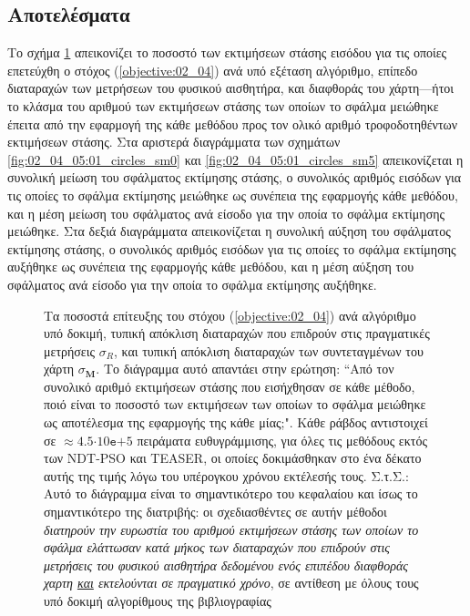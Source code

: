 \subsection{Αποτελέσματα}
\label{subsection:02_04_05:02}

Το σχήμα \ref{fig:02_04_05:01} απεικονίζει το ποσοστό των εκτιμήσεων στάσης
εισόδου για τις οποίες επετεύχθη ο στόχος (\ref{objective:02_04}) ανά υπό
εξέταση αλγόριθμο, επίπεδο διαταραχών των μετρήσεων του φυσικού αισθητήρα, και
διαφθοράς του χάρτη---ήτοι το κλάσμα του αριθμού των εκτιμήσεων στάσης των
οποίων το σφάλμα μειώθηκε έπειτα από την εφαρμογή της κάθε μεθόδου προς τον
ολικό αριθμό τροφοδοτηθέντων εκτιμήσεων στάσης. Στα αριστερά διαγράμματα των
σχημάτων \ref{fig:02_04_05:01_circles_sm0} και
\ref{fig:02_04_05:01_circles_sm5} απεικονίζεται η συνολική μείωση του σφάλματος
εκτίμησης στάσης, ο συνολικός αριθμός εισόδων για τις οποίες το σφάλμα
εκτίμησης μειώθηκε ως συνέπεια της εφαρμογής κάθε μεθόδου, και η μέση μείωση
του σφάλματος ανά είσοδο για την οποία το σφάλμα εκτίμησης μειώθηκε. Στα δεξιά
διαγράμματα απεικονίζεται η συνολική αύξηση του σφάλματος εκτίμησης στάσης, ο
συνολικός αριθμός εισόδων για τις οποίες το σφάλμα εκτίμησης αυξήθηκε ως
συνέπεια της εφαρμογής κάθε μεθόδου, και η μέση αύξηση του σφάλματος ανά είσοδο
για την οποία το σφάλμα εκτίμησης αυξήθηκε.


\begin{figure}\vspace{1.5cm}\hspace{0.6cm}%
  
  \vspace{0.75cm}
  \caption{\small Τα ποσοστά επίτευξης του στόχου (\ref{objective:02_04}) ανά
           αλγόριθμο υπό δοκιμή, τυπική απόκλιση διαταραχών που επιδρούν στις
           πραγματικές μετρήσεις $\sigma_R$, και τυπική απόκλιση διαταραχών των
           συντεταγμένων του χάρτη $\sigma_{\bm{M}}$. Το διάγραμμα αυτό
           απαντάει στην ερώτηση: ``Από τον συνολικό αριθμό εκτιμήσεων στάσης
           που εισήχθησαν σε κάθε μέθοδο, ποιό είναι το ποσοστό των εκτιμήσεων
           των οποίων το σφάλμα μειώθηκε ως αποτέλεσμα της εφαρμογής της κάθε
           μίας;". Κάθε ράβδος αντιστοιχεί σε $\approx
           4.5$$\cdot$$10\texttt{e}$$+$$5$ πειράματα ευθυγράμμισης, για όλες
           τις μεθόδους εκτός των NDT-PSO και TEASER, οι οποίες δοκιμάσθηκαν
           στο ένα δέκατο αυτής της τιμής λόγω του υπέρογκου χρόνου εκτέλεσής
           τους.  Σ.τ.Σ.: Αυτό το διάγραμμα είναι το σημαντικότερο του
           κεφαλαίου και ίσως το σημαντικότερο της διατριβής: οι σχεδιασθέντες
           σε αυτήν μέθοδοι \textit{διατηρούν την ευρωστία του αριθμού
           εκτιμήσεων στάσης των οποίων το σφάλμα ελάττωσαν κατά μήκος των
           διαταραχών που επιδρούν στις μετρήσεις του φυσικού αισθητήρα
           δεδομένου ενός επιπέδου διαφθοράς χαρτη \underline{και} εκτελούνται
           σε πραγματικό χρόνο}, σε αντίθεση με όλους τους υπό δοκιμή
           αλγορίθμους της βιβλιογραφίας}
  \label{fig:02_04_05:01}
\end{figure}

